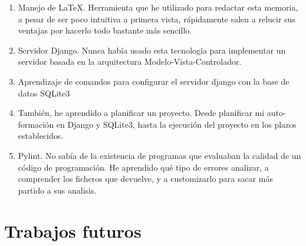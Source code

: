 \documentclass[a4paper, 12pt]{book}
\begin{document}
\begin{enumerate}
  \item Manejo de \LaTeX . Herramienta que he utilizado para redactar esta memoria, a pesar de ser poco intuitiva a primera vista, rápidamente salen a relucir sus ventajas por hacerlo todo bastante más sencillo.
  \item Servidor Django. Nunca había usado esta tecnología para implementar un servidor basada en la arquitectura Modelo-Vista-Controlador. 
  \item Aprendizaje de comandos para configurar el servidor django con la base de datos SQLite3
  \item También, he aprendido a planificar un proyecto. Desde planificar mi auto-formación en Django y SQLite3, hasta la ejecución del proyecto en los plazos establecidos.
  \item Pylint. No sabía de la existencia de programas que evaluaban la calidad de un código de programación. He aprendido qué tipo de errores analizar, a comprender los ficheros que devuelve, y a customizarlo para sacar más partido a sus analisis.
\end{enumerate}

\section{Trabajos futuros}
\label{sec:trabajos_futuros}
\end{document}
